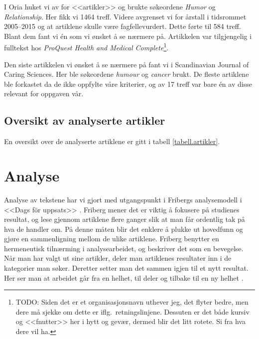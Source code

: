 I Oria huket vi av for <<artikler>> og brukte søkeordene \textit{Humor} og
\textit{Relationship}. Her fikk vi 1464 treff. Videre avgrenset vi for årstall
i tidsrommet 2005--2015 og at artiklene skulle være fagfellevurdert. Dette
førte til 584 treff. Blant dem fant vi én som vi ønsket å se nærmere på.
Artikkelen var tilgjengelig i fulltekst hos \textit{ProQuest Health and Medical
Complete}\footnote{TODO: Siden det er et organisasjonsnavn uthever jeg, det
flyter bedre, men dere må sjekke om dette er iflg.~retningslinjene. Dessuten er
det både kursiv og <<fnutter>> her i hytt og gevær, dermed blir det litt
rotete. Si fra hva dere vil ha.}.

Den siste artikkelen vi ønsket å se nærmere på fant vi i Scandinavian Journal
of Caring Sciences. Her ble søkeordene \textit{humour} og \textit{cancer}
brukt. De fleste artiklene ble forkastet da de ikke oppfylte våre kriterier, og
av 17 treff var bare én av disse relevant for oppgaven vår.

\subsection{Oversikt av analyserte artikler}

En oversikt over de analyserte artiklene er gitt i tabell
\vref{tabell.artikler}.



\section{Analyse}

Analyse av tekstene har vi gjort med utgangspunkt i Fribergs analysemodell i
<<Dags för uppsats>> \citeyear{friberg2006}. Friberg mener det er viktig å
fokusere på studienes resultat, og lese gjennom artiklene flere ganger slik at
man får ordentlig tak på hva de handler om. På denne måten blir det enklere å
plukke ut hovedfunn og gjøre en sammenligning mellom de ulike artiklene.
Friberg benytter en hermeneutisk tilnærming i analysearbeidet, og beskriver det
som en bevegelse. Når man har valgt ut sine artikler, deler man artiklenes
resultater inn i de kategorier man søker. Deretter setter man det sammen igjen
til et nytt resultat. Her ser man at arbeidet går fra en helhet, til deler og
tilbake til en ny helhet \cite[s.~110]{friberg2006}.

